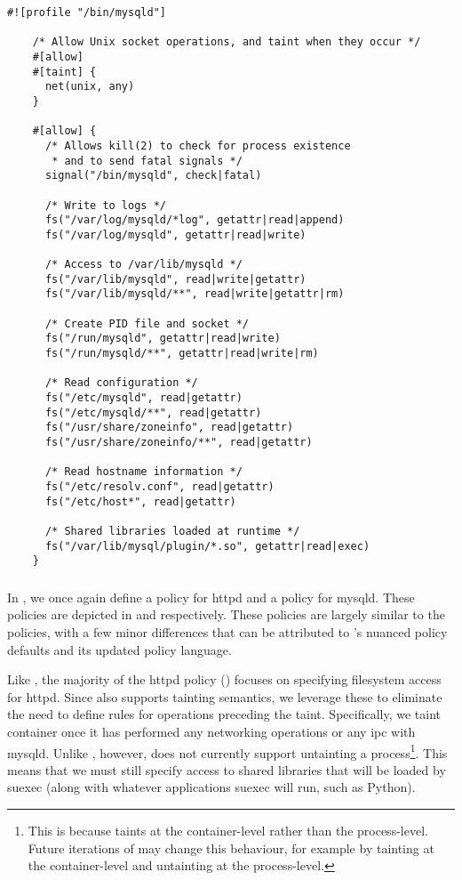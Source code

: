 \begin{lstlisting}[language=bpfbox, gobble=4, float=false, caption={[A \bpfbox{} policy for MySQL]
  A \bpfbox{} policy for MySQL.
  %\todo{Describe this}
}, label={lst:bpfbox-mysql}]
    #![profile "/bin/mysqld"]

    /* Allow Unix socket operations, and taint when they occur */
    #[allow]
    #[taint] {
      net(unix, any)
    }

    #[allow] {
      /* Allows kill(2) to check for process existence
       * and to send fatal signals */
      signal("/bin/mysqld", check|fatal)

      /* Write to logs */
      fs("/var/log/mysqld/*log", getattr|read|append)
      fs("/var/log/mysqld", getattr|read|write)

      /* Access to /var/lib/mysqld */
      fs("/var/lib/mysqld", read|write|getattr)
      fs("/var/lib/mysqld/**", read|write|getattr|rm)

      /* Create PID file and socket */
      fs("/run/mysqld", getattr|read|write)
      fs("/run/mysqld/**", getattr|read|write|rm)

      /* Read configuration */
      fs("/etc/mysqld", read|getattr)
      fs("/etc/mysqld/**", read|getattr)
      fs("/usr/share/zoneinfo", read|getattr)
      fs("/usr/share/zoneinfo/**", read|getattr)

      /* Read hostname information */
      fs("/etc/resolv.conf", read|getattr)
      fs("/etc/host*", read|getattr)

      /* Shared libraries loaded at runtime */
      fs("/var/lib/mysql/plugin/*.so", getattr|read|exec)
    }
\end{lstlisting}

\subsubsection{\bpfcontain{}}

In \bpfcontain{}, we once again define a policy for httpd and a policy for mysqld.  These
policies are depicted in  and 
respectively. These policies are largely similar to the \bpfbox{} policies, with a few
minor differences that can be attributed to \bpfcontain{}'s nuanced policy defaults and
its updated policy language.

Like \bpfbox{}, the majority of the \bpfcontain{} httpd policy
() focuses on specifying filesystem access for httpd. Since
\bpfcontain{} also supports tainting semantics, we leverage these to eliminate the need to
define rules for operations preceding the taint. Specifically, we taint container once it
has performed any networking operations or any \gls{ipc} with mysqld. Unlike \bpfbox{},
however, \bpfcontain{} does not currently support untainting a process\footnote{This is
because \bpfcontain{} taints at the container-level rather than the process-level. Future
iterations of \bpfcontain{} may change this behaviour, for example by tainting at the
container-level and untainting at the process-level.}. This means that we must still
specify access to shared libraries that will be loaded by suexec (along with whatever
applications suexec will run, such as Python).

